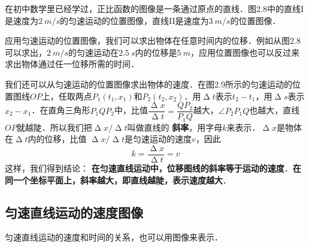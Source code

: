 在初中数学里已经学过，正比函数的图像是一条通过原点的直线．图2.8中的直线I是速度为$\qty{2}{m/s}$的匀速运动的位置图像，直线II是速度为$\qty{3}{m/s}$的位置图像．

应用匀速运动的位置图像，我们可以求出物体在任意时间内的位移．例如从图2.8可以求出，$\qty{2}{m/s}$的匀速运动在$\qty{2.5}{s}$内的位移是$\qty{5}{m}$，应用位置图像也可以反过来求出物体通过任一位移所需的时间．


我们还可以从匀速运动的位置图像求出物体的速度．在图2.9所示的匀速运动的位置图线$OP$上，任取两点$P_1(t_1,x_1)$和$P_2(t_2,x_2)$．用$\upDelta t$表示$t_2-t_1$，用$\upDelta s$表示$x_2-x_1$．在直角三角形$P_1QP_2$中，比值$\dfrac{\upDelta x}{\upDelta t}=\dfrac{QP_2}{P_1Q}$越大，$\angle P_2P_1Q$也越大，直线$OP$就越陡．所以我们把$\upDelta x/\upDelta t$叫做直线的\textbf{ 斜率}，用字母$k$来表示．$\upDelta x$是物体在$\upDelta t$内的位移，比值 $\upDelta x/\upDelta t$是匀速运动的速度$v$，因此
\begin{equation}
    k=\frac{\upDelta x}{\upDelta t}=v
\end{equation}
这样，我们得到结论：\textbf{ 在匀速直线运动中，位移图线的斜率等于运动的速度}．\textbf{在同一个坐标平面上，斜率越大，即直线越陡，表示速度越大}．



\subsection{匀速直线运动的速度图像}

匀速直线运动的速度和时间的关系，也可以用图像来表示．

